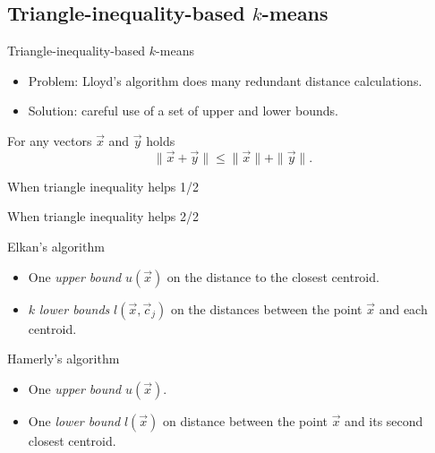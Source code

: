 \documentclass[10pt, compress]{beamer}
\newcommand{\x}{\vec{x}}
\newcommand{\cj}{\vec{c}_j}
\newcommand{\ux}{u(\x)}
\newcommand{\lxcj}{l(\x, \cj)}
\begin{document}
\subsection{Triangle-inequality-based \texorpdfstring{$k$}{k}-means}

\begin{frame}{Triangle-inequality-based \texorpdfstring{$k$}{k}-means}
  \begin{itemize}
    \item Problem: Lloyd's algorithm does many redundant distance calculations.
    \item Solution: careful use of a set of upper and lower bounds.
  \end{itemize}
  \begin{theorem} \label{thm:triange}
    For any vectors $\vec{x}$ and $\vec{y}$ holds
    \begin{equation*}
       \| \vec{x} + \vec{y} \| \leq \|\vec{x}\| + \|\vec{y}\|.
    \end{equation*}
 \end{theorem}
\end{frame}

\begin{frame}{When triangle inequality helps 1/2}
  
\end{frame}

\begin{frame}{When triangle inequality helps 2/2}
  
\end{frame}

\begin{frame}{Elkan's algorithm}
  \begin{itemize}
    \item One \emph{upper bound} $\ux$ on the distance to the closest centroid.
    \item $k$ \emph{lower bounds} $\lxcj$ on the distances between the
      point $\x$ and each centroid.
  \end{itemize}
  \begin{center}
    
  \end{center}
\end{frame}

\begin{frame}{Hamerly's algorithm}
  \begin{itemize}
    \item One \emph{upper bound} $u(\vec{x})$.
    \item {\color{red} One} \emph{lower bound} $l(\vec{x})$ on distance
      between the point $\vec{x}$ and its second closest centroid.
  \end{itemize}
  \begin{center}
    
  \end{center}
\end{frame}
\end{document}
